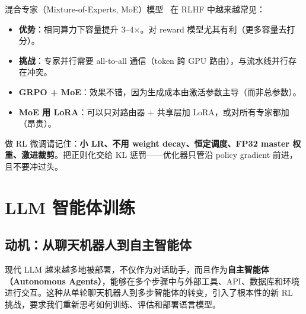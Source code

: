 \begin{intuitionbox}
混合专家（Mixture-of-Experts, MoE）模型~\cite{fedus2022switch} 在 RLHF 中越来越常见：

\begin{itemize}
  \item \textbf{优势}：相同算力下容量提升 3--4$\times$。对 reward 模型尤其有利（更多容量去打分）。
  \item \textbf{挑战}：专家并行需要 all-to-all 通信（token 跨 GPU 路由），与流水线并行存在冲突。
  \item \textbf{GRPO + MoE}：效果不错，因为生成成本由激活参数主导（而非总参数）。
  \item \textbf{MoE 用 LoRA}：可以只对路由器 + 共享层加 LoRA，或对所有专家都加（昂贵）。
\end{itemize}
\end{intuitionbox}

\begin{intuitionbox}[RL 优化器口诀]
做 RL 微调请记住：\textbf{小 LR、不用 weight decay、恒定调度、FP32 master 权重、激进裁剪}。把正则化交给 KL 惩罚——优化器只管沿 policy gradient 前进，且不要冲过头。
\end{intuitionbox}

\chapter{LLM 智能体训练}
\label{llm-agentic-training}

\section{动机：从聊天机器人到自主智能体}
\label{motivation-from-chatbots-to-autonomous-agents}

现代 LLM 越来越多地被部署，不仅作为对话助手，而且作为\textbf{自主智能体（Autonomous Agents）}，能够在多个步骤中与外部工具、API、数据库和环境进行交互。这种从单轮聊天机器人到多步智能体的转变，引入了根本性的新 RL 挑战，要求我们重新思考如何训练、评估和部署语言模型。

